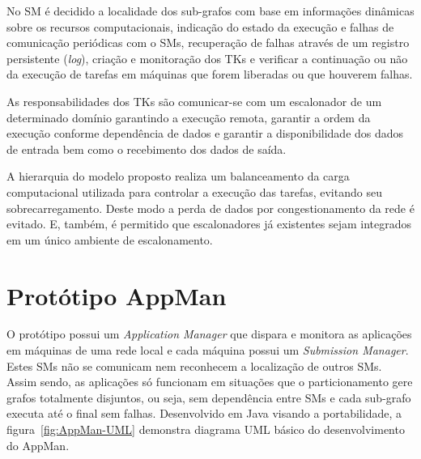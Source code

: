 No SM é decidido a localidade dos sub-grafos com base em informações dinâmicas sobre os recursos computacionais, indicação do estado da execução e falhas de comunicação periódicas com o SMs, recuperação de falhas através de um registro persistente (\emph{log}), criação e monitoração dos TKs e verificar a continuação ou não da execução de tarefas em máquinas que forem liberadas ou que houverem falhas.

As responsabilidades dos TKs são comunicar-se com um escalonador de um determinado domínio garantindo a execução remota, garantir a ordem da execução conforme dependência de dados e garantir a disponibilidade dos dados de entrada bem como o recebimento dos dados de saída.

A hierarquia do modelo proposto realiza um balanceamento da carga computacional utilizada para controlar a execução das tarefas, evitando seu sobrecarregamento. Deste modo a perda de dados por congestionamento da rede é evitado. E, também, é permitido que escalonadores já existentes sejam integrados em um único ambiente de escalonamento.

\section{Protótipo AppMan}

O protótipo possui um \emph{Application Manager} que dispara e monitora as aplicações em máquinas de uma rede local e cada máquina possui um \emph{Submission Manager}. Estes SMs não se comunicam nem reconhecem a localização de outros SMs. Assim sendo, as aplicações só funcionam em situações que o particionamento gere grafos totalmente disjuntos, ou seja, sem dependência entre SMs e cada sub-grafo executa até o final sem falhas. Desenvolvido em Java visando a portabilidade, a figura~\ref{fig:AppMan-UML} demonstra diagrama UML básico do desenvolvimento do AppMan.

